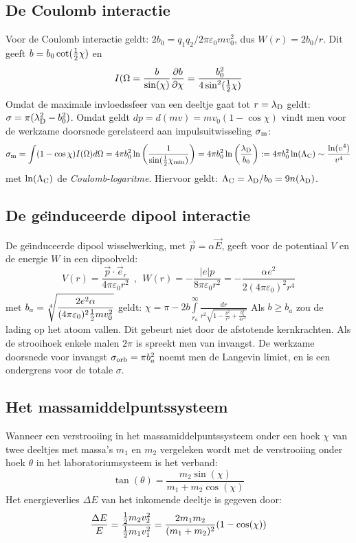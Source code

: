 \documentclass[twoside]{report}
\begin{document}
\subsection{De Coulomb interactie}
Voor de Coulomb interactie geldt: $2b_0=q_1q_2/2\pi\varepsilon_0mv_0^2$, dus
$W(r)=2b_0/r$. Dit geeft $b=b_0\cot(\mbox{$\frac{1}{2}$}\chi)$ en
\[
I(\Omega=\frac{b}{\sin(\chi)}\frac{\partial b}{\partial \chi}=\frac{b_0^2}{4\sin^2(\mbox{$\frac{1}{2}$}\chi)}
\]
Omdat de maximale invloedssfeer van een deeltje gaat tot $r=\lambda_{\rm D}$
geldt: $\sigma=\pi(\lambda_{\rm D}^2-b_0^2)$. Omdat geldt
$dp=d(mv)=mv_0(1-\cos\chi)$ vindt men  voor de werkzame doorsnede gerelateerd
aan impulsuitwisseling $\sigma_{\rm m}$:
\[
\sigma_{\rm m}=\int(1-\cos\chi)I(\Omega)d\Omega=4\pi b_0^2\ln\left(\frac{1}{\sin(\mbox{$\frac{1}{2}$}\chi_{\rm min})}\right)=
4\pi b_0^2\ln\left(\frac{\lambda_{\rm D}}{b_0}\right):=4\pi b_0^2\ln(\Lambda_{\rm C})
\sim\frac{\ln(v^4)}{v^4}
\]
met $\ln(\Lambda_{\rm C})$ de {\it Coulomb-logaritme}. Hiervoor geldt:
$\Lambda_{\rm C}=\lambda_{\rm D}/b_0=9n(\lambda_{\rm D})$.

\subsection{De ge\"{\i}nduceerde dipool interactie}
De ge\"{\i}nduceerde dipool wisselwerking, met $\vec{p}=\alpha\vec{E}$,
geeft voor de potentiaal $V$ en de energie $W$ in een dipoolveld:
\[
V(r)=\frac{\vec{p}\cdot\vec{e}_r}{4\pi\varepsilon_0r^2}~~,~~
W(r)=-\frac{|e|p}{8\pi\varepsilon_0 r^2}=-\frac{\alpha e^2}{2(4\pi\varepsilon_0)^2r^4}
\]
met
$\displaystyle b_a=\sqrt[4]{\frac{2e^2\alpha}{(4\pi\varepsilon_0)^2\mbox{$\frac{1}{2}$} mv_0^2}}$
geldt:
$\displaystyle\chi=\pi-2b\int\limits_{r_a}^\infty \frac{dr}{r^2\sqrt{\displaystyle 1-\frac{b^2}{r^2}+\frac{b_a^4}{4r^4}}}$
\npar
Als $b\geq b_a$ zou de lading op het atoom vallen. Dit gebeurt niet door de
afstotende kernkrachten. Als de strooihoek enkele malen $2\pi$ is spreekt men
van invangst. De werkzame doorsnede voor invangst $\sigma_{\rm orb}=\pi b_a^2$
noemt men de Langevin limiet, en is een ondergrens voor de totale $\sigma$.

\subsection{Het massamiddelpuntssysteem}
Wanneer een verstrooiing in het massamiddelpuntssysteem onder een hoek $\chi$
van twee deeltjes met massa's $m_1$ en $m_2$ vergeleken wordt met de
verstrooiing onder hoek $\theta$ in het laboratoriumsysteem is het verband:
\[
\tan(\theta)=\frac{m_2\sin(\chi)}{m_1+m_2\cos(\chi)}
\]
Het energieverlies $\Delta E$ van het inkomende deeltje is gegeven door:
\[
\frac{\Delta E}{E}=\frac{\mbox{$\frac{1}{2}$} m_2v_2^2}{\mbox{$\frac{1}{2}$} m_1v_1^2}=\frac{2m_1m_2}{(m_1+m_2)^2}(1-\cos(\chi))
\]
\end{document}
